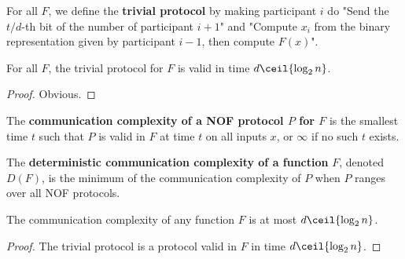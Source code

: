 \begin{definition}
  \label{def:trivial-protocol}

  For all $F$, we define the {\bf trivial protocol} by making participant $i$ do "Send the $t / d$-th bit of the number of participant $i + 1$" and "Compute $x_i$ from the binary representation given by participant $i - 1$, then compute $F(x)$".
\end{definition}

\begin{lemma}
  \label{lem:trivial-protocol-valid}

  For all $F$, the trivial protocol for $F$ is valid in time $d\ceil{\log_2 n}$.
\end{lemma}
\begin{proof}

  Obvious.
\end{proof}

\begin{definition}
  \label{def:det-protocol-complex}
  \leanok

  The {\bf communication complexity of a NOF protocol $P$ for $F$} is the smallest time $t$ such that $P$ is valid in $F$ at time $t$ on all inputs $x$, or $\infty$ if no such $t$ exists.
\end{definition}

\begin{definition}
  \label{def:det-fun-complex}
  \leanok

  The {\bf deterministic communication complexity of a function} $F$, denoted $D(F)$, is the minimum of the communication complexity of $P$ when $P$ ranges over all NOF protocols.
\end{definition}

\begin{lemma}
  \label{lem:trivial-bound-det-fun-complex}

  The communication complexity of any function $F$ is at most $d\ceil{\log_2 n}$.
\end{lemma}
\begin{proof}

  The trivial protocol is a protocol valid in $F$ in time $d\ceil{\log_2 n}$.
\end{proof}

